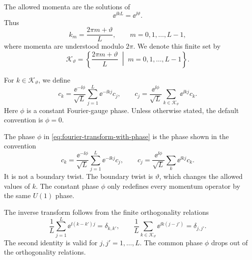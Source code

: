 The allowed momenta are the solutions of
\begin{equation}
    \ee^{\ii k L}=\ee^{\ii\vartheta}.
\end{equation}
Thus
\begin{equation}
\label{eq:allowed-momenta-with-twist}
    k_m
    =
    \frac{2\pi m+\vartheta}{L},
    \qquad
    m=0,1,\ldots,L-1,
\end{equation}
where momenta are understood modulo $2\pi$.  We denote this finite set by
\begin{equation}
    \mathcal{K}_\vartheta
    =
    \left\{
    \frac{2\pi m+\vartheta}{L}\;\middle|\;m=0,1,\ldots,L-1
    \right\}.
\end{equation}

\begin{definition}
\label{def:fourier-transform-with-phase}
For $k\in\mathcal{K}_\vartheta$, we define
\begin{equation}
\label{eq:fourier-transform-with-phase}
    c_k
    =
    \frac{\ee^{-\ii\phi}}{\sqrt{L}}
    \sum_{j=1}^{L}\ee^{-\ii k j}c_j,
    \qquad
    c_j
    =
    \frac{\ee^{\ii\phi}}{\sqrt{L}}
    \sum_{k\in\mathcal{K}_\vartheta}\ee^{\ii k j}c_k.
\end{equation}
Here $\phi$ is a constant Fourier-gauge phase.  Unless otherwise stated, the
default convention is $\phi=0$.
\end{definition}

The phase $\phi$ in \cref{eq:fourier-transform-with-phase} is the phase shown in
the convention
\begin{equation}
    c_k
    =
    \frac{\ee^{-\ii\phi}}{\sqrt{L}}
    \sum_{j=1}^{L}\ee^{-\ii k j}c_j,
    \qquad
    c_j
    =
    \frac{\ee^{\ii\phi}}{\sqrt{L}}
    \sum_{k}\ee^{\ii k j}c_k.
\end{equation}
It is not a boundary twist.  The boundary twist is $\vartheta$, which changes the
allowed values of $k$.  The constant phase $\phi$ only redefines every momentum
operator by the same $U(1)$ phase.

The inverse transform follows from the finite orthogonality relations
\begin{equation}
\label{eq:finite-fourier-orthogonality}
    \frac{1}{L}\sum_{j=1}^{L}\ee^{\ii(k-k')j}
    =
    \delta_{k,k'},
    \qquad
    \frac{1}{L}\sum_{k\in\mathcal{K}_\vartheta}\ee^{\ii k(j-j')}
    =
    \delta_{j,j'} .
\end{equation}
The second identity is valid for $j,j'=1,\ldots,L$.  The common phase $\phi$ drops
out of the orthogonality relations.

